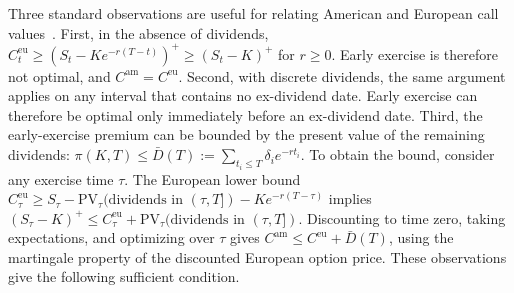 \documentclass[sigconf,review,anonymous]{acmart}
\begin{document}
Three standard observations are useful for relating American and European call values~\cite{merton1973,black1975}. First, in the absence of dividends, $C^{\mathrm{eu}}_t\ge(S_t-Ke^{-r(T-t)})^+\ge(S_t-K)^+$ for $r\ge0$. Early exercise is therefore not optimal, and $C^{\mathrm{am}}=C^{\mathrm{eu}}$. Second, with discrete dividends, the same argument applies on any interval that contains no ex-dividend date. Early exercise can therefore be optimal only immediately before an ex-dividend date. Third, the early-exercise premium can be bounded by the present value of the remaining dividends: $\pi(K,T)\le\bar D(T):=\sum_{t_i\le T}\delta_i e^{-rt_i}$. To obtain the bound, consider any exercise time $\tau$. The European lower bound $C^{\mathrm{eu}}_\tau\ge S_\tau-\mathrm{PV}_\tau(\text{dividends in }(\tau,T])-Ke^{-r(T-\tau)}$ implies $(S_\tau-K)^+\le C^{\mathrm{eu}}_\tau+\mathrm{PV}_\tau(\text{dividends in }(\tau,T])$. Discounting to time zero, taking expectations, and optimizing over $\tau$ gives
$C^{\mathrm{am}}\le C^{\mathrm{eu}}+\bar D(T)$, using the martingale property of the discounted European option price.
These observations give the following sufficient condition.
\end{document}
